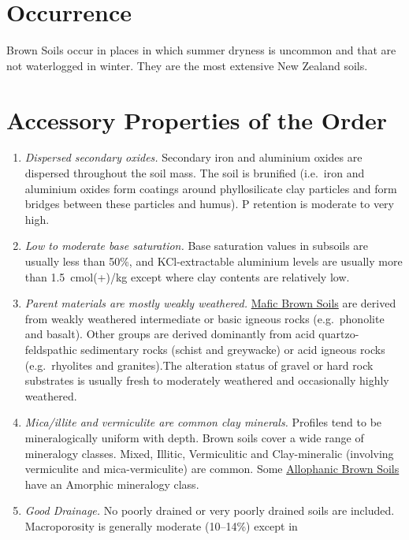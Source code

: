 \documentclass[
  letterpaper,
  DIV=11,
  numbers=noendperiod]{scrreprt}
\providecommand{\tightlist}{%
  \setlength{\itemsep}{0pt}\setlength{\parskip}{0pt}}\usepackage{longtable,booktabs,array}
\begin{document}
\hypertarget{sec-occ-B}{%
\section{Occurrence}\label{sec-occ-B}}

Brown Soils occur in places in which summer dryness is uncommon and that
are not waterlogged in winter. They are the most extensive New Zealand
soils.

\hypertarget{sec-acc-B}{%
\section{Accessory Properties of the Order}\label{sec-acc-B}}

\begin{enumerate}
\def\labelenumi{\arabic{enumi}.}
\tightlist
\item
  \emph{Dispersed secondary oxides.} Secondary iron and aluminium oxides
  are dispersed throughout the soil mass. The soil is brunified
  (i.e.~iron and aluminium oxides form coatings around phyllosilicate
  clay particles and form bridges between these particles and humus). P
  retention is moderate to very high.
\item
  \emph{Low to moderate base saturation.} Base saturation values in
  subsoils are usually less than 50\%, and KCl-extractable aluminium
  levels are usually more than 1.5~cmol(+)/kg except where clay contents
  are relatively low.
\item
  \emph{Parent materials are mostly weakly weathered.}
  \protect\hyperlink{sec-BM}{Mafic Brown Soils} are derived from weakly
  weathered intermediate or basic igneous rocks (e.g.~phonolite and
  basalt). Other groups are derived dominantly from acid
  quartzo-feldspathic sedimentary rocks (schist and greywacke) or acid
  igneous rocks (e.g.~rhyolites and granites).The alteration status of
  gravel or hard rock substrates is usually fresh to moderately
  weathered and occasionally highly weathered.
\item
  \emph{Mica/illite and vermiculite are common clay minerals.} Profiles
  tend to be mineralogically uniform with depth. Brown soils cover a
  wide range of mineralogy classes. Mixed, Illitic, Vermiculitic and
  Clay-mineralic (involving vermiculite and mica-vermiculite) are
  common. Some \protect\hyperlink{sec-BA}{Allophanic Brown Soils} have
  an Amorphic mineralogy class.
\item
  \emph{Good Drainage.} No poorly drained or very poorly drained soils
  are included. Macroporosity is generally moderate (10--14\%) except in

\end{enumerate}
\end{document}
